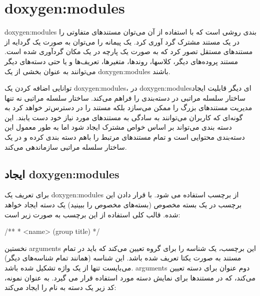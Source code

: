 %
% 
% 
% 
%
\section{\glspl{doxygen:module}‌}

\glspl{doxygen:module} بندی روشی است که با استفاده از آن می‌توان مستندهای متفاوتی را در یک
مستند مشترک گرد آوری کرد. یک پیمانه را می‌توان به صورت یک گردایه از مستندهای مستقل
تصور کرد که به صورت یک پارچه در یک مکان گردآوری شده است. مستند
پروده‌های دیگر، کلاسها، روندها، متغیرها، تعریف‌ها و یا حتی دسته‌های دیگر  می‌توانند به عنوان
بخشی از یک \glspl{doxygen:module} باشند.
 
توانایی اضافه کردن یک \glspl{doxygen:module}، در \glspl{doxygen:module}‌ای دیگر قابلیت ایجاد ساختار سلسله مراتبی در
دسته‌بندی را فراهم می‌کند. ساختار سلسله مراتبی نه تنها مدیریت مستندهای بزرگ
را ممکن می‌سازد بلکه مستند را در دسترس‌تر خواهد کرد به گونه‌ای که کاربران
می‌توانند به سادگی به مستندهای مورد نیاز خود دست یابند. این دسته بندی می‌تواند بر اساس خواص
مشترک ایجاد شود اما به طور معمول این دسته‌بندی محتوایی است و تمام مستندهای مرتبط را باهم 
دسته بندی کرده و در یک ساختار سلسله مراتبی سازماندهی می‌کند.

\subsection{ایجاد \glspl{doxygen:module}}

برای تعریف یک \glspl{doxygen:module} از برچسب  استفاده می شود. با قرار دادن این برچسب
در یک بسته مخصوص (بسته‌های مخصوص را ببینید) یک دسته ایجاد خواهد شده. قالب کلی
استفاده از این برچسب به صورت زیر است:
\begin{C++}
/**
 *  <name> (group title)
 */
\end{C++}

نخستین \glspl{argument} این برچسب، یک شناسه را برای گروه تعیین می‌کند که باید در تمام
مستند به صورت یکتا تعریف شده باشد. این شناسه (همانند تمام شناسه‌های دیگر) می‌بایست
تنها از یک واژه تشکیل شده باشد. \glspl{argument} دوم عنوان برای دسته
تعیین می‌کند، که در مستندها برای نمایش دسته مورد استفاده قرار می گیرد. 
به عنوان نمونه، کد زیر یک دسته به نام   را ایجاد می‌کند:

